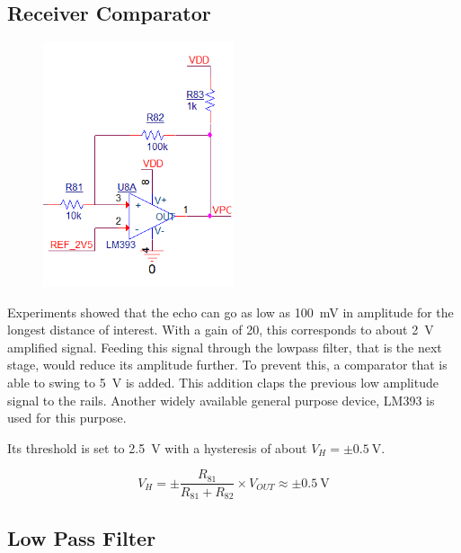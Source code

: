 \documentclass[12pt, a4paper]{article}
\begin{document}
        \subsection{Receiver Comparator}

            \begin{figure}[H]\centering
                \includegraphics[width = 0.5\textwidth]{schematics/receiver_comparator.png}
                \caption[]{}
            \end{figure}

            Experiments showed that the echo can go as low as \SI{100}{\milli\volt} in amplitude for the longest distance of interest. With a gain of 20, this corresponds to about \SI{2}{\volt} amplified signal. Feeding this signal through the lowpass filter, that is the next stage, would reduce its amplitude further. To prevent this, a comparator that is able to swing to \SI{5}{\volt} is added. This addition claps the previous low amplitude signal to the rails. Another widely available general purpose device, LM393 is used for this purpose. 

            \noindent Its threshold is set to \SI{2.5}{\volt} with a hysteresis of about $V_H = \pm \SI{0.5}{\volt}$.
            
            \begin{equation}
                V_H = \pm \frac{ R_{81} } {R_{81} + R_{82} } \times V_{OUT} \approx \pm \SI{0.5}{\volt}
            \end{equation}
            
        
        \subsection{Low Pass Filter}
\end{document}
